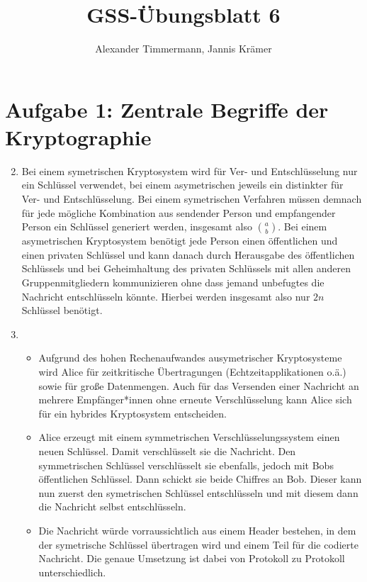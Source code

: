 \documentclass[a4paper,11pt,ngerman]{scrartcl}
\author{Alexander Timmermann, Jannis Krämer}
\title{GSS-Übungsblatt 6}
\date{}
\begin{document}
\maketitle
\thispagestyle{empty}

\doublespace

\section*{Aufgabe 1: Zentrale Begriffe der Kryptographie}
  \begin{enumerate}[\bf 1.]
    \setcounter{enumi}{1}
    \item
      Bei einem symetrischen Kryptosystem wird für Ver- und Entschlüsselung
      nur ein Schlüssel verwendet, bei einem asymetrischen jeweils ein distinkter für
      Ver- und Entschlüsselung. Bei einem symetrischen Verfahren müssen demnach
      für jede mögliche Kombination aus sendender Person und empfangender Person ein
      Schlüssel generiert werden, insgesamt also $\binom{a}{b}$. Bei einem asymetrischen
      Kryptosystem benötigt jede Person einen öffentlichen und einen privaten Schlüssel
      und kann danach durch Herausgabe des öffentlichen Schlüssels und bei Geheimhaltung
      des privaten Schlüssels mit allen anderen Gruppenmitgliedern kommunizieren ohne
      dass jemand unbefugtes die Nachricht entschlüsseln könnte. Hierbei werden insgesamt
      also nur $2n$ Schlüssel benötigt.
    \item
      \begin{itemize}
        \item
          Aufgrund des hohen Rechenaufwandes ausymetrischer Kryptosysteme wird
          Alice für zeitkritische Übertragungen (Echtzeitapplikationen o.ä.) sowie
          für große Datenmengen. Auch für das Versenden einer Nachricht an mehrere
          Empfänger*innen ohne erneute Verschlüsselung kann Alice sich für ein
          hybrides Kryptosystem entscheiden.
        \item
          Alice erzeugt mit einem symmetrischen Verschlüsselungssystem einen
          neuen Schlüssel. Damit verschlüsselt sie die Nachricht. Den symmetrischen
          Schlüssel verschlüsselt sie ebenfalls, jedoch mit Bobs öffentlichen Schlüssel.
          Dann schickt sie beide Chiffres an Bob. Dieser kann nun zuerst den symetrischen
          Schlüssel entschlüsseln und mit diesem dann die Nachricht selbst entschlüsseln.
        \item
          Die Nachricht würde vorraussichtlich aus einem Header bestehen, in dem der
          symetrische Schlüssel übertragen wird und einem Teil für die codierte Nachricht.
          Die genaue Umsetzung ist dabei von Protokoll zu Protokoll unterschiedlich.
      \end{itemize}
  \end{enumerate}
\end{document}
